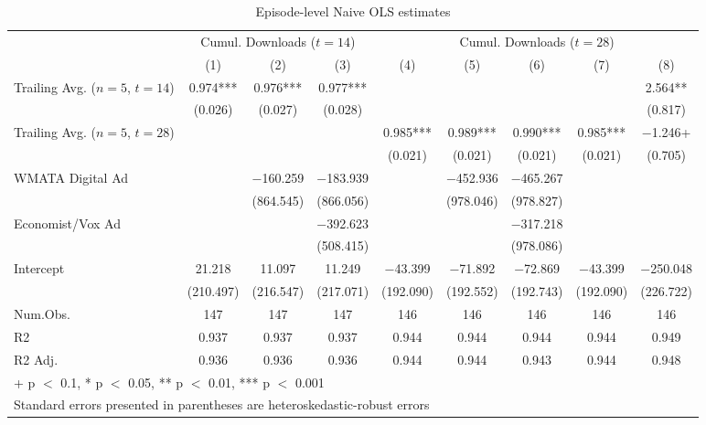 \begin{table}

\caption{Episode-level Naive OLS estimates \label{tab:ep-level-naive-ols}}
\centering
\begin{tabular}[t]{lcccccccc}
\toprule
\multicolumn{1}{c}{ } & \multicolumn{3}{c}{Cumul. Downloads ($t=14$)} & \multicolumn{5}{c}{Cumul. Downloads ($t=28$)} \\
\cmidrule(l{3pt}r{3pt}){2-4} \cmidrule(l{3pt}r{3pt}){5-9}
  & (1) & (2) & (3) & (4) & (5) & (6) & (7) & (8)\\
\midrule
Trailing Avg. ($n=5$, $t=14$) & \num{0.974}*** & \num{0.976}*** & \num{0.977}*** &  &  &  &  & \num{2.564}**\\
 & (\num{0.026}) & (\num{0.027}) & (\num{0.028}) &  &  &  &  & (\num{0.817})\\
Trailing Avg. ($n=5$, $t=28$) &  &  &  & \num{0.985}*** & \num{0.989}*** & \num{0.990}*** & \num{0.985}*** & \num{-1.246}+\\
 &  &  &  & (\num{0.021}) & (\num{0.021}) & (\num{0.021}) & (\num{0.021}) & (\num{0.705})\\
WMATA Digital Ad &  & \num{-160.259} & \num{-183.939} &  & \num{-452.936} & \num{-465.267} &  & \\
 &  & (\num{864.545}) & (\num{866.056}) &  & (\num{978.046}) & (\num{978.827}) &  & \\
Economist/Vox Ad &  &  & \num{-392.623} &  &  & \num{-317.218} &  & \\
 &  &  & (\num{508.415}) &  &  & (\num{978.086}) &  & \\
Intercept & \num{21.218} & \num{11.097} & \num{11.249} & \num{-43.399} & \num{-71.892} & \num{-72.869} & \num{-43.399} & \num{-250.048}\\
 & (\num{210.497}) & (\num{216.547}) & (\num{217.071}) & (\num{192.090}) & (\num{192.552}) & (\num{192.743}) & (\num{192.090}) & (\num{226.722})\\
\midrule
Num.Obs. & \num{147} & \num{147} & \num{147} & \num{146} & \num{146} & \num{146} & \num{146} & \num{146}\\
R2 & \num{0.937} & \num{0.937} & \num{0.937} & \num{0.944} & \num{0.944} & \num{0.944} & \num{0.944} & \num{0.949}\\
R2 Adj. & \num{0.936} & \num{0.936} & \num{0.936} & \num{0.944} & \num{0.944} & \num{0.943} & \num{0.944} & \num{0.948}\\
\bottomrule
\multicolumn{9}{l}{\rule{0pt}{1em}+ p $<$ 0.1, * p $<$ 0.05, ** p $<$ 0.01, *** p $<$ 0.001}\\
\multicolumn{9}{l}{\rule{0pt}{1em}Standard errors presented in parentheses are heteroskedastic-robust errors}\\
\end{tabular}
\end{table}
